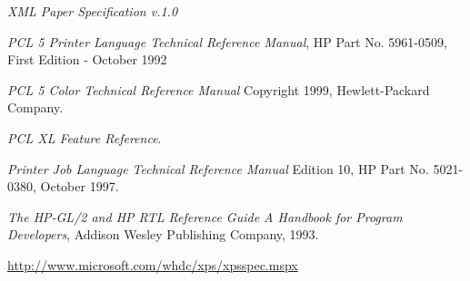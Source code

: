 \documentclass[10pt]{article}
\begin{document}
\begin{thebibliography}{99}
  
\emph{XML Paper Specification v.1.0}
  
 \emph{PCL 5 Printer Language Technical Reference
    Manual}, HP Part No. 5961-0509, First Edition - October 1992
  
 \emph{PCL 5 Color Technical Reference Manual}
  Copyright 1999, Hewlett-Packard Company.

 \emph{PCL XL Feature Reference}.
  
 \emph{Printer Job Language Technical Reference
    Manual} Edition 10, HP Part No. 5021-0380, October 1997.
  
 \emph{The HP-GL/2 and HP RTL Reference Guide A
    Handbook for Program Developers}, Addison Wesley Publishing 
  Company, 1993.

\url{http://www.microsoft.com/whdc/xps/xpsspec.mspx}

\end{thebibliography}
\end{document}
